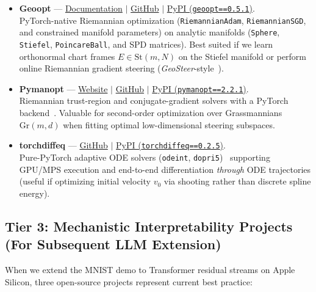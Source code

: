 \documentclass[11pt,a4paper]{article}
\theoremstyle{definition}
\begin{document}
\begin{itemize}[leftmargin=*]
    \item \textbf{Geoopt} ---
    \href{https://geoopt.readthedocs.io}{Documentation} $\mid$ \href{https://github.com/geoopt/geoopt}{GitHub} $\mid$ \href{https://pypi.org/project/geoopt/}{PyPI (\texttt{geoopt==0.5.1})}.\\
    PyTorch-native Riemannian optimization (\texttt{RiemannianAdam}, \texttt{RiemannianSGD}, and constrained manifold parameters) \cite{kochurov2020geoopt,becigneul2019riemannian} on analytic manifolds (\texttt{Sphere}, \texttt{Stiefel}, \texttt{PoincareBall}, and SPD matrices). Best suited if we learn orthonormal chart frames $E \in \mathrm{St}(m, N)$ on the Stiefel manifold or perform online Riemannian gradient steering (\emph{GeoSteer}-style~\cite{kazama2026geosteer}).

    \item \textbf{Pymanopt} ---
    \href{https://pymanopt.org}{Website} $\mid$ \href{https://github.com/pymanopt/pymanopt}{GitHub} $\mid$ \href{https://pypi.org/project/pymanopt/}{PyPI (\texttt{pymanopt==2.2.1})}.\\
    Riemannian trust-region and conjugate-gradient solvers with a PyTorch backend~\cite{townsend2016pymanopt,boumal2023intro}. Valuable for second-order optimization over Grassmannians $\mathrm{Gr}(m, d)$ when fitting optimal low-dimensional steering subspaces.

    \item \textbf{torchdiffeq} ---
    \href{https://github.com/rtqichen/torchdiffeq}{GitHub} $\mid$ \href{https://pypi.org/project/torchdiffeq/}{PyPI (\texttt{torchdiffeq==0.2.5})}.\\
    Pure-PyTorch adaptive ODE solvers (\texttt{odeint}, \texttt{dopri5})~\cite{chen2018neuralode} supporting GPU/MPS execution and end-to-end differentiation \emph{through} ODE trajectories (useful if optimizing initial velocity $v_0$ via shooting rather than discrete spline energy).
\end{itemize}

\subsection{Tier 3: Mechanistic Interpretability Projects (For Subsequent LLM Extension)}

When we extend the MNIST demo to Transformer residual streams on Apple Silicon, three open-source projects represent current best practice:
\end{document}
